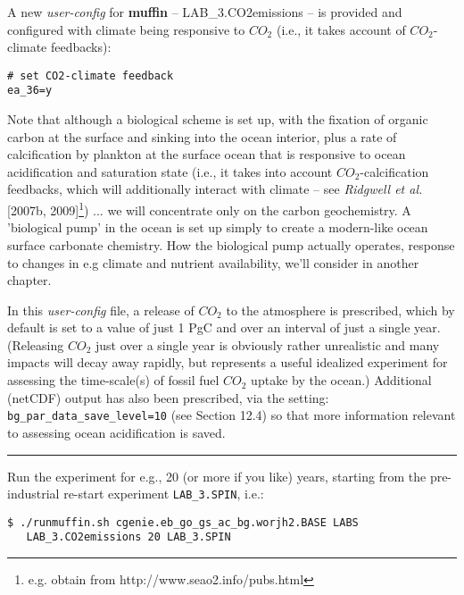 \documentclass[11pt,fleqn]{book} %
\begin{document}
A new \textit{user-config} for \textbf{muffin} -- \footnotesize\textsf{LAB\_3.CO2emissions }\normalsize -- is provided and configured with climate being responsive to \(CO_{2}\) (i.e., it takes account of \(CO_{2}\)-climate feedbacks): 
\vspace{-2pt}\begin{verbatim}
# set CO2-climate feedback
ea_36=y
\end{verbatim}\vspace{-2pt}
\noindent Note that although a biological scheme is set up, with the fixation of organic carbon at the surface and sinking into the ocean interior, plus a rate of calcification by plankton at the surface ocean that is responsive to ocean acidification and saturation state (i.e., it takes into account \(CO_{2}\)-calcification feedbacks, which will additionally interact with climate – see \textit{Ridgwell et al.} [2007b, 2009]\footnote{e.g. obtain from http://www.seao2.info/pubs.html}) ... we will concentrate only on the carbon geochemistry. A 'biological pump' in the ocean is set up simply to create a modern-like ocean surface carbonate chemistry. How the biological pump actually operates, response to changes in e.g climate and nutrient availability, we'll consider in another chapter.

In this \textit{user-config} file, a release of \(CO_{2}\) to the atmosphere is prescribed, which by default is set to a value of just 1 PgC and over an interval of just a single year. (Releasing \(CO_{2}\) just over a single year is obviously rather unrealistic and many impacts will decay away rapidly, but represents a useful idealized experiment for assessing the time-scale(s) of fossil fuel \(CO_{2}\) uptake by the ocean.) Additional (netCDF) output has also been prescribed, via the setting: \texttt{bg\_par\_data\_save\_level=10} (see Section 12.4) so that more information relevant to assessing ocean acidification is saved.

\vspace{1mm}
\noindent\rule{4cm}{0.1mm}
\vspace{2mm}

\noindent Run the experiment for e.g., 20 (or more if you like) years, starting from the pre-industrial re-start experiment \texttt{LAB\_3.SPIN}, i.e.: 
\vspace{-2pt}\begin{verbatim}
$ ./runmuffin.sh cgenie.eb_go_gs_ac_bg.worjh2.BASE LABS
   LAB_3.CO2emissions 20 LAB_3.SPIN
\end{verbatim}\vspace{-2pt}
\end{document}
